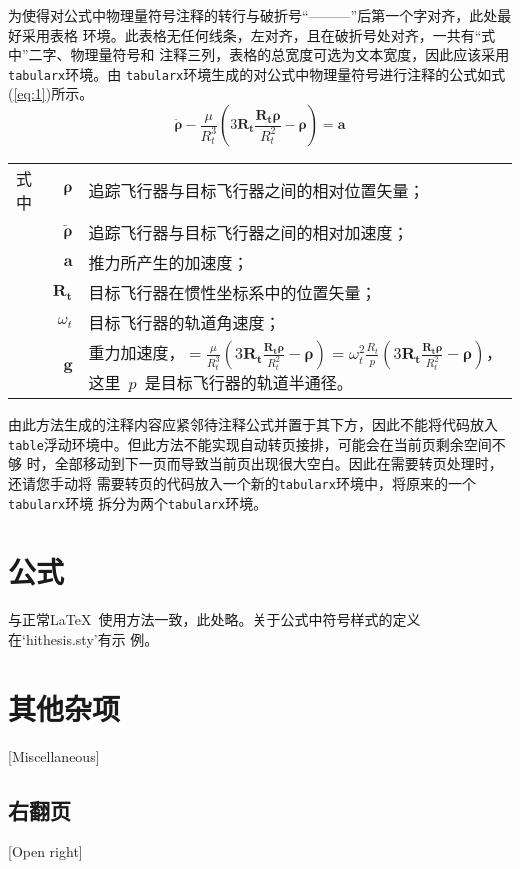 为使得对公式中物理量符号注释的转行与破折号“———”后第一个字对齐，此处最好采用表格
环境。此表格无任何线条，左对齐，且在破折号处对齐，一共有“式中”二字、物理量符号和
注释三列，表格的总宽度可选为文本宽度，因此应该采用\verb|tabularx|环境。由
\verb|tabularx|环境生成的对公式中物理量符号进行注释的公式如式(\ref{eq:1})所示。
\begin{equation}\label{eq:1}
\ddot{\boldsymbol{\rho}}-\frac{\mu}{R_{t}^{3}}\left(3\mathbf{R_{t}}\frac{\mathbf{R_{t}\rho}}{R_{t}^{2}}-\boldsymbol{\rho}\right)=\mathbf{a}
\end{equation}
\begin{tabularx}{\textwidth}{@{}l@{\quad}r@{———}X@{}}
式中& $\boldsymbol{\rho}$ &追踪飞行器与目标飞行器之间的相对位置矢量；\\
&  $\boldsymbol{\ddot{\rho}}$&追踪飞行器与目标飞行器之间的相对加速度；\\
&  $\mathbf{a}$   &推力所产生的加速度；\\
&  $\mathbf{R_t}$ & 目标飞行器在惯性坐标系中的位置矢量；\\
&  $\omega_{t}$ & 目标飞行器的轨道角速度；\\
&  $\mathbf{g}$ & 重力加速度，$=\frac{\mu}{R_{t}^{3}}\left(
3\mathbf{R_{t}}\frac{\mathbf{R_{t}\rho}}{R_{t}^{2}}-\boldsymbol{\rho}\right)=\omega_{t}^{2}\frac{R_{t}}{p}\left(
3\mathbf{R_{t}}\frac{\mathbf{R_{t}\rho}}{R_{t}^{2}}-\boldsymbol{\rho}\right)$，这里~$p$~是目标飞行器的轨道半通径。
\end{tabularx}\vspace{3.15bp}
由此方法生成的注释内容应紧邻待注释公式并置于其下方，因此不能将代码放入
\verb|table|浮动环境中。但此方法不能实现自动转页接排，可能会在当前页剩余空间不够
时，全部移动到下一页而导致当前页出现很大空白。因此在需要转页处理时，还请您手动将
需要转页的代码放入一个新的\verb|tabularx|环境中，将原来的一个\verb|tabularx|环境
拆分为两个\verb|tabularx|环境。

\section{公式}
与正常\LaTeX\ 使用方法一致，此处略。关于公式中符号样式的定义在`hithesis.sty'有示
例。

\section{其他杂项}[Miscellaneous]

\subsection{右翻页}[Open right]


